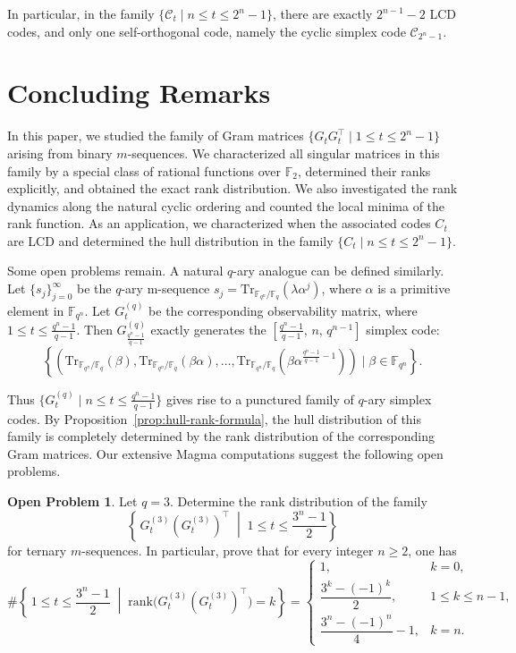 \documentclass[hidelinks,onefignum,onetabnum]{siamart251216}
\theoremstyle{definition}
\newtheorem{open}[theorem]{Open Problem}
\theoremstyle{remark}
\providecommand{\rank}{{\mathrm{rank}}}
\providecommand{\Tr}{{\mathrm{Tr}}}
\begin{document}
In particular, in the family $\{\mathcal{C}_{t}\mid n\le t\le 2^{n}-1\}$, there are exactly $2^{n-1}-2$ LCD codes, and only one self-orthogonal code, namely the cyclic simplex code $\mathcal{C}_{2^{n}-1}$.


\section{Concluding Remarks}\label{sec-conclu}

In this paper, we studied the family of Gram matrices $\{G_tG_t^\top\mid 1\le t\le 2^n-1\}$ arising from binary $m$-sequences. We characterized all singular matrices in this family by a special class of rational functions over $\mathbb F_2$, determined their ranks explicitly, and obtained the exact rank distribution. We also investigated the rank dynamics along the natural cyclic ordering and counted the local minima of the rank function. As an application, we characterized when the associated codes $C_t$ are LCD and determined the hull distribution in the family $\{C_t\mid  n\le t\le 2^n-1\}$.



Some open problems remain. A natural $q$-ary analogue can be defined similarly. Let $\{s_j\}_{j=0}^{\infty}$ be the $q$-ary m-sequence $s_j=\Tr_{\mathbb F_{q^n}/\mathbb F_q}(\lambda\alpha^j)$, where $\alpha$ is a primitive element in $\mathbb{F}_{q^{n}}$. Let $G_t^{(q)}$ be the corresponding observability matrix, where $1\le t\le \frac{q^n-1}{q-1}$. Then $G_{\frac{q^n-1}{q-1}}^{(q)}$ exactly generates the $\left[\frac{q^n-1}{q-1},\,n,\,q^{n-1}\right]$  simplex code:
\[
\left\{\left(\Tr_{\mathbb F_{q^n}/\mathbb F_q}(\beta),\Tr_{\mathbb F_{q^n}/\mathbb F_q}(\beta\alpha),\dots,\Tr_{\mathbb F_{q^n}/\mathbb F_q}\!\left(\beta\alpha^{\frac{q^n-1}{q-1}-1}\right)\right)\mid \beta\in\mathbb F_{q^n}\right\}.
\]


Thus $\{G_t^{(q)}\mid n\le t\le\frac{q^n-1}{q-1} \}$ gives rise to a punctured family of $q$-ary simplex codes. By Proposition~\ref{prop:hull-rank-formula}, the hull distribution of this family is completely determined by the rank distribution of the corresponding Gram matrices. Our extensive Magma computations suggest the following open problems.

\begin{open}
Let $q=3$. Determine the rank distribution of the family
	\[
	\left\{\,G_t^{(3)}(G_t^{(3)})^\top \;\middle|\; 1\le t\le \frac{3^n-1}{2}\right\}
	\]
	for ternary $m$-sequences. In particular, prove that for every integer $n\ge 2$, one has
	\[
	\#\left\{\,1\le t\le \frac{3^n-1}{2} \;\middle|\; \rank\!\bigl(G_t^{(3)}(G_t^{(3)})^\top\bigr)=k \right\}
	=
	\begin{cases}
		1, & k=0,\\[1ex]
		\dfrac{3^k-(-1)^k}{2}, & 1\le k\le n-1,\\[2ex]
		\dfrac{3^n-(-1)^n}{4}-1, & k=n.
	\end{cases}
	\]
\end{open}
\end{document}
